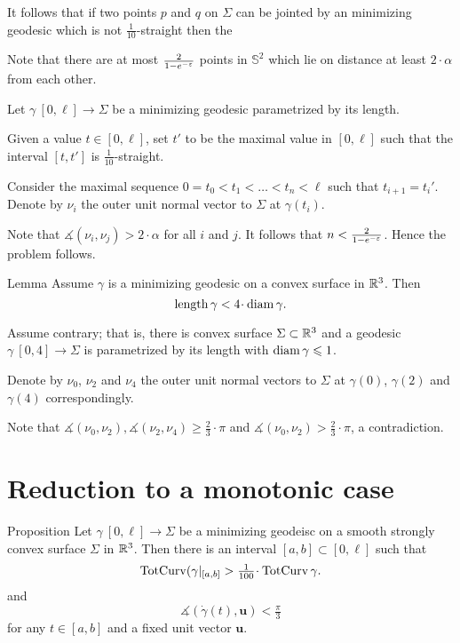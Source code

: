 \documentclass[a4paper,10pt]{amsart}
\begin{document}
It follows that if two points $p$ and $q$ on $\Sigma$ can be jointed by an minimizing geodesic which is not $\tfrac1{10}$-straight
then the 

Note that there are at most $\tfrac2{1-e^{-\varepsilon}}$ points in $\mathbb S^2$ which lie on distance at least $2\cdot\alpha$ from each other.

Let $\gamma\:[0,\ell]\to \Sigma$ be a minimizing geodesic parametrized by its length.

Given a value $t\in [0,\ell]$,
set $t'$ to be the maximal value in $[0,\ell]$ such that the interval $[t,t']$ is $\tfrac1{10}$-straight.

Consider the maximal sequence $0=t_0<t_1<\dots<t_n<\ell$
such that $t_{i+1}=t_i'$.
Denote by $\nu_i$ the outer unit normal vector to $\Sigma$ at $\gamma(t_i)$. 

Note that $\measuredangle(\nu_i,\nu_j)>2\cdot\alpha$ for all $i$ and $j$.
It follows that $n<\tfrac2{1-e^{-\varepsilon}}$.
Hence the problem follows.
\qeds


\begin{thm}{Lemma}\label{lem:diam-length}
Assume $\gamma$ is a minimizing geodesic on a convex surface in $\mathbb{R}^3$.
Then 
\[\length\gamma< 4\cdot\diam \gamma.\]
\end{thm}

Assume contrary;
that is, 
there is convex surface $\Sigma\subset\mathbb{R}^3$
and a geodesic $\gamma\:[0,4]\to \Sigma$ 
is parametrized by its length with $\operatorname{diam} \gamma\leqslant 1$.

Denote by $\nu_0$, $\nu_2$ and $\nu_4$ the outer unit normal vectors
to $\Sigma$ at $\gamma(0)$, $\gamma(2)$ and $\gamma(4)$ correspondingly.

Note that $\measuredangle(\nu_0,\nu_2), \measuredangle(\nu_2,\nu_4)\ge\tfrac23\cdot\pi$ and $\measuredangle(\nu_0,\nu_2)>\tfrac23\cdot\pi$,
a contradiction.
\qeds



\section{Reduction to a monotonic case}

\begin{thm}{Proposition}\label{prop:almost-const}
Let $\gamma\:[0,\ell]\to\Sigma$ be a minimizing geodeisc 
on a smooth strongly convex surface $\Sigma$ in $\mathbb{R}^3$.
Then there is an interval $[a,b]\subset[0,\ell]$
such that 
\[\tc(\gamma|_{[a,b]}>\tfrac1{100}\cdot\tc\gamma.\]
and 
\[\measuredangle(\dot\gamma(t),\bm{u})<\tfrac\pi3\] 
for any $t\in[a,b]$
and a fixed unit vector $\bm{u}$.
\end{thm}
\end{document}
